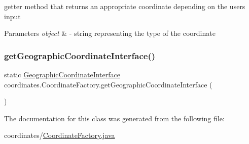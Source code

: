 getter method that returns an appropriate coordinate depending on the users input 


\begin{DoxyParams}{Parameters}
{\em object} & -\/ string representing the type of the coordinate \\
\hline
\end{DoxyParams}
\mbox{\label{classcoordinates_1_1_coordinate_factory_a8821fec76e79c8cf44617eb95f3768dd}} 
\subsubsection{\texorpdfstring{get\+Geographic\+Coordinate\+Interface()}{getGeographicCoordinateInterface()}}
{\footnotesize\ttfamily static \hyperlink{classcoordinates_1_1_geographic_coordinate_interface}{Geographic\+Coordinate\+Interface} coordinates.\+Coordinate\+Factory.\+get\+Geographic\+Coordinate\+Interface (\begin{DoxyParamCaption}{ }\end{DoxyParamCaption})\hspace{0.3cm}{\ttfamily [static]}}



The documentation for this class was generated from the following file\+:\begin{DoxyCompactItemize}
\item 
coordinates/\hyperlink{_coordinate_factory_8java}{Coordinate\+Factory.\+java}\end{DoxyCompactItemize}
